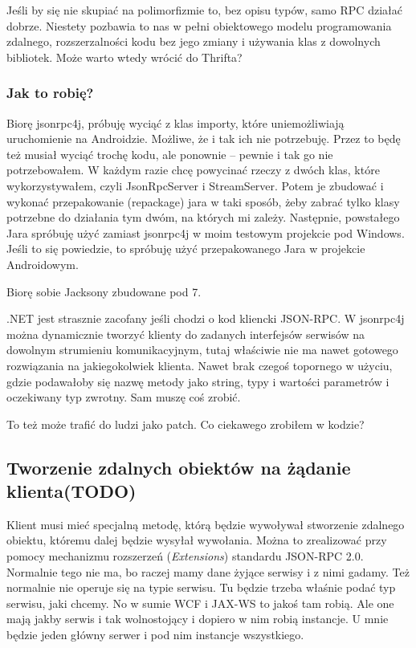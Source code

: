 Jeśli by się nie skupiać na polimorfizmie to, bez opisu typów, samo RPC działać dobrze. Niestety pozbawia to nas w pełni obiektowego modelu programowania zdalnego, rozszerzalności kodu bez jego zmiany i używania klas z dowolnych bibliotek. Może warto wtedy wrócić do Thrifta?

\subsubsection{Jak to robię?}
Biorę jsonrpc4j, próbuję wyciąć z klas importy, które uniemożliwiają uruchomienie na Androidzie. Możliwe, że i tak ich nie potrzebuję. Przez to będę też musiał wyciąć trochę kodu, ale ponownie -- pewnie i tak go nie potrzebowałem.
W każdym razie chcę powycinać rzeczy z dwóch klas, które wykorzystywałem, czyli JsonRpcServer i StreamServer. Potem je zbudować i wykonać przepakowanie (repackage) jara w taki sposób, żeby zabrać tylko klasy potrzebne do działania tym dwóm, na których mi zależy. Następnie, powstałego Jara spróbuję użyć zamiast jsonrpc4j w moim testowym projekcie pod Windows. Jeśli to się powiedzie, to spróbuję użyć przepakowanego Jara w projekcie Androidowym.

Biorę sobie Jacksony zbudowane pod 7.

.NET jest strasznie zacofany jeśli chodzi o kod kliencki JSON-RPC. W jsonrpc4j można dynamicznie tworzyć klienty do zadanych interfejsów serwisów na dowolnym strumieniu komunikacyjnym, tutaj właściwie nie ma nawet gotowego rozwiązania na jakiegokolwiek klienta. Nawet brak czegoś topornego w użyciu, gdzie podawałoby się nazwę metody jako string, typy i wartości parametrów i oczekiwany typ zwrotny.
Sam muszę coś zrobić.

To też może trafić do ludzi jako patch.
Co ciekawego zrobiłem w kodzie?


\subsection{Tworzenie zdalnych obiektów na żądanie klienta(TODO)}
Klient musi mieć specjalną metodę, którą będzie wywoływał stworzenie zdalnego obiektu, któremu dalej będzie wysyłał wywołania.
Można to zrealizować przy pomocy mechanizmu rozszerzeń (\emph{Extensions}) standardu JSON-RPC 2.0.
Normalnie tego nie ma, bo raczej mamy dane żyjące serwisy i z nimi gadamy. Też normalnie nie operuje się na typie serwisu. Tu będzie trzeba właśnie podać typ serwisu, jaki chcemy. No w sumie WCF i JAX-WS to jakoś tam robią. Ale one mają jakby serwis i tak wolnostojący i dopiero w nim robią instancje. U mnie będzie jeden główny serwer i pod nim instancje wszystkiego.


